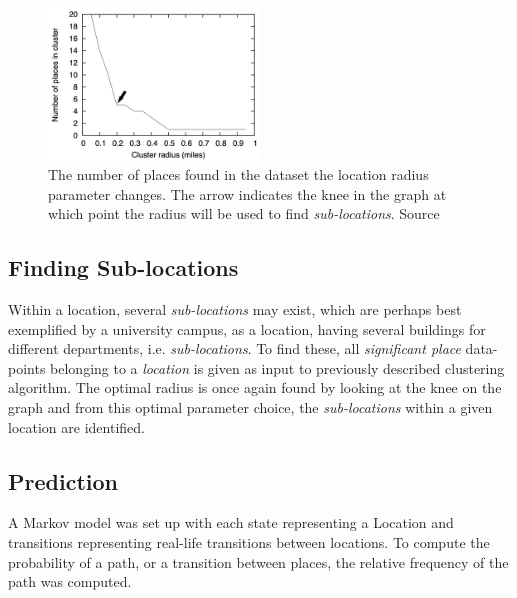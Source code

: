 \begin{figure}
    \centering
    \includegraphics[width=0.5\textwidth]{images/knee_graph.png}
    \caption{The number of places found in the dataset the location radius parameter changes. The arrow indicates the knee in the graph at which point the radius will be used to find \textit{sub-locations}. Source \cite{learning_significant_locations}}
    \label{fig:my_label}
\end{figure}

\subsection{Finding Sub-locations}
Within a location, several \textit{sub-locations} may exist, which are perhaps best exemplified by a university campus, as a location, having several buildings for different departments, i.e. \textit{sub-locations}. To find these, all \textit{significant place} data-points belonging to a \textit{location} is given as input to previously described clustering algorithm. The optimal radius is once again found by looking at the knee on the graph and from this optimal parameter choice, the \textit{sub-locations} within a given location are identified.

\subsection{Prediction}
A Markov model was set up with each state representing a Location and transitions representing real-life transitions between locations. To compute the probability of a path, or a transition between places, the relative frequency of the path was computed.

